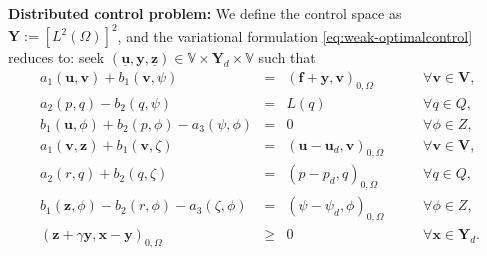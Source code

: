 \documentclass[smallextended]{svjour3}
\numberwithin{equation}{section}
\numberwithin{figure}{section}
\numberwithin{table}{section}
\newcommand\bI{\mathbf{I}}
\newcommand\bV{\mathbf{V}}
\newcommand\ff{\boldsymbol{f}}
\newcommand\beps{\boldsymbol{\varepsilon}}
\newcommand\buu{\underline{\boldsymbol{u}}}
\newcommand\buz{\underline{\boldsymbol{z}}}
\newcommand\bx{\boldsymbol{x}}
\newcommand\by{\boldsymbol{y}}
\newcommand\bu{\boldsymbol{u}}
\newcommand\bv{\boldsymbol{v}}
\newcommand\bz{\boldsymbol{z}}
\newcommand{\bYd}{\boldsymbol{Y}_d}
\newcommand{\bY}{\boldsymbol{Y}}
\newcommand{\bbV}{\mathbb{V}}
\newcommand\bdiv{{\mathop{\mathbf{div}}\nolimits}}
\newcommand\vdiv{{\mathop{\mathrm{div}}\nolimits}}
\begin{document}
\bigskip
\noindent 
{\bf Distributed control problem:}
We define the control space as $\bY:= [L^2(\Omega)]^2$, and the variational formulation \eqref{eq:weak-optimalcontrol} reduces to:
  seek  $(\buu, \by, \buz) \in \bbV \times \bYd\times \bbV $ 
	 such that
	\begin{subequations} \label{eq:weak-D}
		\begin{alignat}{6}
			a_1(\bu, \bv) +  b_1(\bv, \psi) & = &  (\ff+\by, \bv)_{0, \Omega}  & \quad & \forall \bv \in \bV, \label{eq:weak-D-a}\\
			a_2(p,q)  - b_2(q,\psi) & = & L(q)  \qquad \quad & \quad & \forall q \in Q,  \label{eq:weak-D-b}\\
			b_1(\bu, \phi) + b_2(p,\phi) - a_3(\psi, \phi) & =& 0  \qquad \qquad& \quad & \forall \phi \in Z,  \label{eq:weak-D-c}\\
			a_1(\bv, \bz) +  b_1(\bv, \zeta)     &=& (\bu - \bu_d, \bv)_{0, \Omega} \,  &\quad&\forall \bv \in \bV,  \label{eq:weak-D-d}\\
			a_2(r,q) + b_2(q,\zeta)  &=&( p - p_d, q)_{0, \Omega} \, &\quad&\forall q \in Q,  \label{eq:weak-D-e} \\
			b_1(\bz, \phi) -  b_2(r,\phi) - a_3(\zeta, \phi)  &=& (\psi- \psi_d, \phi)_{0, \Omega} \,  &\quad&\forall \phi \in Z,  \label{eq:weak-D-f}\\
			( \bz + \gamma \by, \bx - \by )_{0,\Omega} &\ge& 0 \qquad \qquad&\quad& \forall \bx \in \bYd. \label{eq:optimal-D}
		\end{alignat}
	\end{subequations}
\end{document}
